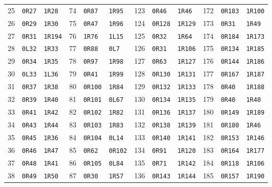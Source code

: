 \begin{center}
\begin{tabular}{@{}rll@{\hspace{1.6em}}rll@{\hspace{1.6em}}rll@{\hspace{1.6em}}rll@{}}
25 & \texttt{0R27} & \texttt{1R28} & 74 & \texttt{0R87} & \texttt{1R95} & 123 & \texttt{0R46} & \texttt{1R46} & 172 & \texttt{0R183} & \texttt{1R100}\\
26 & \texttt{0R29} & \texttt{1R30} & 75 & \texttt{0R47} & \texttt{1R96} & 124 & \texttt{0R128} & \texttt{1R129} & 173 & \texttt{0R31} & \texttt{1R49}\\
27 & \texttt{0R31} & \texttt{1R194} & 76 & \texttt{1R76} & \texttt{1L15} & 125 & \texttt{0R32} & \texttt{1R64} & 174 & \texttt{0R184} & \texttt{1R173}\\
28 & \texttt{0L32} & \texttt{1R33} & 77 & \texttt{0R88} & \texttt{0L7} & 126 & \texttt{0R31} & \texttt{1R106} & 175 & \texttt{0R134} & \texttt{1R185}\\
29 & \texttt{0R34} & \texttt{1R35} & 78 & \texttt{0R97} & \texttt{1R98} & 127 & \texttt{0R63} & \texttt{1R127} & 176 & \texttt{0R144} & \texttt{1R186}\\
30 & \texttt{0L33} & \texttt{1L36} & 79 & \texttt{0R41} & \texttt{1R99} & 128 & \texttt{0R130} & \texttt{1R131} & 177 & \texttt{0R167} & \texttt{1R187}\\
31 & \texttt{0R37} & \texttt{1R38} & 80 & \texttt{0R100} & \texttt{1R84} & 129 & \texttt{0R132} & \texttt{1R133} & 178 & \texttt{0R40} & \texttt{1R188}\\
32 & \texttt{0R39} & \texttt{1R40} & 81 & \texttt{0R101} & \texttt{0L67} & 130 & \texttt{0R134} & \texttt{1R135} & 179 & \texttt{0R40} & \texttt{1R40}\\
33 & \texttt{0R41} & \texttt{1R42} & 82 & \texttt{0R102} & \texttt{1R82} & 131 & \texttt{0R136} & \texttt{1R137} & 180 & \texttt{0R149} & \texttt{1R189}\\
34 & \texttt{0R43} & \texttt{1R44} & 83 & \texttt{0R103} & \texttt{1R83} & 132 & \texttt{0R138} & \texttt{1R139} & 181 & \texttt{0R180} & \texttt{1R46}\\
35 & \texttt{0R45} & \texttt{1R36} & 84 & \texttt{0R104} & \texttt{0L14} & 133 & \texttt{0R140} & \texttt{1R141} & 182 & \texttt{0R153} & \texttt{1R146}\\
36 & \texttt{0R46} & \texttt{1R47} & 85 & \texttt{0R62} & \texttt{0R102} & 134 & \texttt{0R91} & \texttt{1R120} & 183 & \texttt{0R164} & \texttt{1R177}\\
37 & \texttt{0R48} & \texttt{1R41} & 86 & \texttt{0R105} & \texttt{0L84} & 135 & \texttt{0R71} & \texttt{1R142} & 184 & \texttt{0R118} & \texttt{1R106}\\
38 & \texttt{0R49} & \texttt{1R50} & 87 & \texttt{0R30} & \texttt{1R57} & 136 & \texttt{0R143} & \texttt{1R144} & 185 & \texttt{0R157} & \texttt{1R190}\\

\end{tabular}
\end{center}
